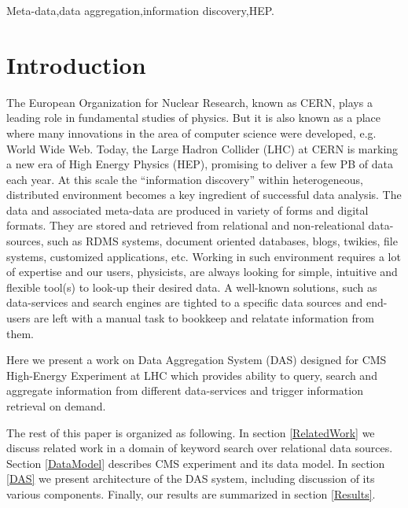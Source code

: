 \documentclass[1p,times]{elsarticle}
\begin{document}
\begin{frontmatter}
\begin{keyword}
Meta-data\sep data aggregation\sep information discovery\sep HEP.


\end{keyword}

\end{frontmatter}


\section{Introduction}
The European Organization for Nuclear Research, known as CERN, plays a leading
role in fundamental studies of physics. But it is also known as a place where
many innovations in the area of computer science were developed, e.g. World Wide Web.
Today, the Large Hadron Collider (LHC) at CERN is marking a new era of High Energy
Physics (HEP), promising to deliver a few PB of data each year. 
At this scale the ``information discovery'' within heterogeneous, distributed 
environment becomes a key ingredient of successful data analysis.
The data and associated meta-data are produced in variety of forms and digital formats.
They are stored and retrieved from relational and non-releational data-sources, such as 
RDMS systems, document oriented databases, blogs, twikies, file systems,
customized applications, etc. 
Working in such environment requires a lot of expertise and our users, physicists, 
are always looking for simple, intuitive and flexible
tool(s) to look-up their desired data. A well-known solutions, such as data-services
and search engines are tighted to a specific data sources and end-users are left 
with a manual task to bookkeep and relatate information from them.

Here we present a work on Data Aggregation System (DAS) designed for
CMS High-Energy Experiment at LHC which provides
ability to query, search and aggregate information from different 
data-services and trigger information retrieval on demand.

The rest of this paper is organized as following. 
In section \ref{RelatedWork} we discuss related work in a domain of 
keyword search over relational data sources.
Section \ref{DataModel} describes CMS experiment and its data model. In section
\ref{DAS} we present architecture of the DAS system, including discussion of its
various components. Finally, our results are summarized in section \ref{Results}.
\end{document}
